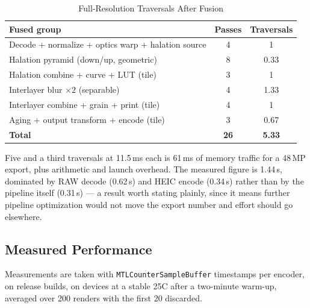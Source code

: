 \begin{table}[htbp]
\caption{Full-Resolution Traversals After Fusion}
\label{tab:traversals}
\begin{center}
\renewcommand{\arraystretch}{1.15}
\begin{tabularx}{\columnwidth}{@{}>{\raggedright\arraybackslash}Xcc@{}}
\toprule
\textbf{Fused group} & \textbf{Passes} & \textbf{Traversals} \\
\midrule
Decode + normalize + optics warp + halation source & 4 & 1 \\
Halation pyramid (down/up, geometric) & 8 & 0.33 \\
Halation combine + curve + LUT (tile) & 3 & 1 \\
Interlayer blur $\times 2$ (separable) & 4 & 1.33 \\
Interlayer combine + grain + print (tile) & 4 & 1 \\
Aging + output transform + encode (tile) & 3 & 0.67 \\
\midrule
\textbf{Total} & \textbf{26} & \textbf{5.33} \\
\bottomrule
\end{tabularx}
\end{center}
\end{table}

Five and a third traversals at 11.5\,ms each is 61\,ms of memory traffic for a
48\,MP export, plus arithmetic and launch overhead. The measured figure is
1.44\,s, dominated by RAW decode (0.62\,s) and HEIC encode (0.34\,s) rather than
by the pipeline itself (0.31\,s) --- a result worth stating plainly, since it
means further pipeline optimization would not move the export number and effort
should go elsewhere.

\subsection{Measured Performance}

Measurements are taken with \texttt{MTLCounterSampleBuffer} timestamps per
encoder, on release builds, on devices at a stable 25\textdegree C after a
two-minute warm-up, averaged over 200 renders with the first 20 discarded.

